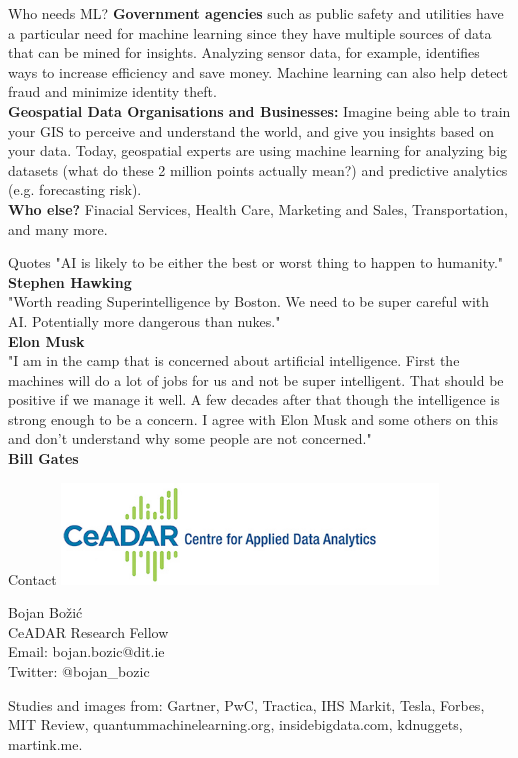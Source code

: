 \documentclass{beamer}
\begin{document}
\begin{frame}{Who needs ML?}
\textbf{Government agencies} such as public safety and utilities have a particular need for machine learning since they have multiple sources of data that can be mined for insights. Analyzing sensor data, for example, identifies ways to increase efficiency and save money. Machine learning can also help detect fraud and minimize identity theft. \\ \vspace{0.5cm}
\textbf{Geospatial Data Organisations and Businesses:} Imagine being able to train your GIS to perceive and understand the world, and give you insights based on your data. Today, geospatial experts are using machine learning for analyzing big datasets (what do these 2 million points actually mean?) and predictive analytics (e.g. forecasting risk). \\ \vspace{0.5cm}
\textbf{Who else?} Finacial Services, Health Care, Marketing and Sales, Transportation, and many more.
\end{frame}

\begin{frame}{Quotes}
"AI is likely to be either the best or worst thing to happen to humanity."\\ \textbf{Stephen Hawking} \\ \vspace{0.5cm}
"Worth reading Superintelligence by Boston. We need to be super careful with AI. Potentially more dangerous than nukes." \\
\textbf{Elon Musk} \\ \vspace{0.5cm}
"I am in the camp that is concerned about artificial intelligence.  First the machines will do a lot of jobs for us and not be super intelligent.  That should be positive if we manage it well.  A few decades after that though the intelligence is strong enough to be a concern.  I agree with Elon Musk and some others on this and don’t understand why some people are not concerned." \\
\textbf{Bill Gates}

\end{frame}

\begin{frame}{Contact}
\includegraphics[width=10cm]{figures/ceadar} 
\begin{flushleft}
Bojan Bo\v{z}i\'{c} \\
CeADAR Research Fellow \\
Email: bojan.bozic@dit.ie \\
Twitter: @bojan\_bozic 
\end{flushleft}
\begin{flushleft}
Studies and images from: Gartner, PwC, Tractica, IHS Markit, Tesla, Forbes, MIT Review, quantummachinelearning.org, insidebigdata.com, kdnuggets, martink.me.
\end{flushleft}
\end{frame}
\end{document}
